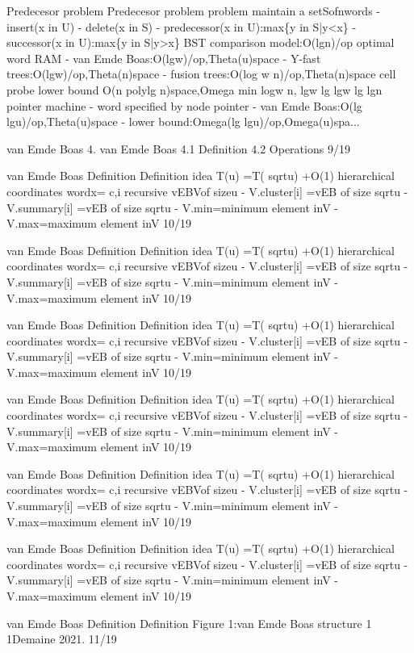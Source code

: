 \begin{description}[leftmargin=!,labelwidth=4.2em,style=nextline]
\item[Pag. 17] Predecesor problem Predecesor problem problem maintain a setSofnwords - insert(x in U) - delete(x in S) - predecessor(x in U):max\{y in S|y<x\} - successor(x in U):max\{y in S|y>x\} BST comparison model:O(lgn)/op optimal word RAM - van Emde Boas:O(lgw)/op,Theta(u)space - Y-fast trees:O(lgw)/op,Theta(n)space - fusion trees:O(log w n)/op,Theta(n)space cell probe lower bound O(n polylg n)space,Omega min logw n, lgw lg lgw lg lgn pointer machine - word specified by node pointer - van Emde Boas:O(lg lgu)/op,Theta(u)space - lower bound:Omega(lg lgu)/op,Omega(u)spa...
\item[Pag. 18] van Emde Boas 4. van Emde Boas 4.1 Definition 4.2 Operations 9/19
\item[Pag. 19] van Emde Boas Definition Definition idea T(u) =T( sqrtu) +O(1) hierarchical coordinates wordx= c,i recursive vEBVof sizeu - V.cluster[i] =vEB of size sqrtu - V.summary[i] =vEB of size sqrtu - V.min=minimum element inV - V.max=maximum element inV 10/19
\item[Pag. 20] van Emde Boas Definition Definition idea T(u) =T( sqrtu) +O(1) hierarchical coordinates wordx= c,i recursive vEBVof sizeu - V.cluster[i] =vEB of size sqrtu - V.summary[i] =vEB of size sqrtu - V.min=minimum element inV - V.max=maximum element inV 10/19
\item[Pag. 21] van Emde Boas Definition Definition idea T(u) =T( sqrtu) +O(1) hierarchical coordinates wordx= c,i recursive vEBVof sizeu - V.cluster[i] =vEB of size sqrtu - V.summary[i] =vEB of size sqrtu - V.min=minimum element inV - V.max=maximum element inV 10/19
\item[Pag. 22] van Emde Boas Definition Definition idea T(u) =T( sqrtu) +O(1) hierarchical coordinates wordx= c,i recursive vEBVof sizeu - V.cluster[i] =vEB of size sqrtu - V.summary[i] =vEB of size sqrtu - V.min=minimum element inV - V.max=maximum element inV 10/19
\item[Pag. 23] van Emde Boas Definition Definition idea T(u) =T( sqrtu) +O(1) hierarchical coordinates wordx= c,i recursive vEBVof sizeu - V.cluster[i] =vEB of size sqrtu - V.summary[i] =vEB of size sqrtu - V.min=minimum element inV - V.max=maximum element inV 10/19
\item[Pag. 24] van Emde Boas Definition Definition idea T(u) =T( sqrtu) +O(1) hierarchical coordinates wordx= c,i recursive vEBVof sizeu - V.cluster[i] =vEB of size sqrtu - V.summary[i] =vEB of size sqrtu - V.min=minimum element inV - V.max=maximum element inV 10/19
\item[Pag. 25] van Emde Boas Definition Definition Figure 1:van Emde Boas structure 1 1Demaine 2021. 11/19

\end{description}
